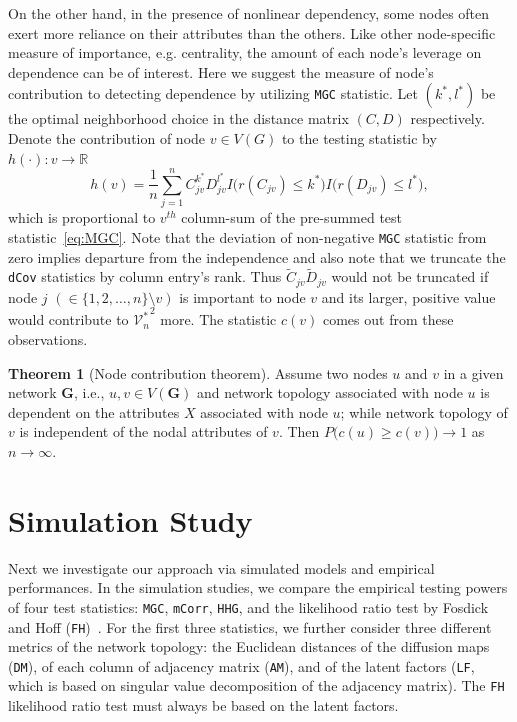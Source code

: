 \documentclass[11pt]{article}
\theoremstyle{definition}
\newtheorem{theorem}{Theorem}[section]
\begin{document}
On the other hand, in the presence of nonlinear dependency, some nodes often exert more reliance on their attributes than the others. Like other node-specific measure of importance, e.g. centrality,  the amount of each node's leverage on dependence can be of interest. Here we suggest the measure of node's contribution to detecting dependence by utilizing \texttt{MGC} statistic. Let $(k^{*}, l^{*})$ be the optimal neighborhood choice in the distance matrix $(C, D)$ respectively. Denote the contribution of node $v \in V(G)$ to the testing statistic by  $h(\cdot) : v \rightarrow \mathbb{R}$
\begin{equation}
\label{eq:contribution}
h(v) =  \frac{1}{n} \sum\limits_{j=1}^{n} C^{k^{*}}_{j v} D^{l^{*}}_{j v} I \big(  r (C_{j v}) \leq k^{*}  \big) I \big( r (D_{ j v }) \leq l^{*} \big), 
\end{equation}
which is proportional to $v^{th}$ column-sum of the pre-summed test statistic~\ref{eq:MGC}. Note that the deviation of non-negative \texttt{MGC} statistic from zero implies departure from the independence and also note that we truncate the \texttt{dCov} statistics by column entry's rank. Thus $\tilde{C}_{jv} \tilde{D}_{jv}$ would not be truncated if node $j$ $(\in \{ 1,2, \ldots, n \} \setminus v )$ is important to node $v$ and its larger, positive value would contribute to ${\mathcal{V}^{*}_{n}}^2$ more. The statistic $c(v)$ comes out from these observations. 

\begin{theorem}[Node contribution theorem]
	\label{contributiontheorem}
	Assume two nodes $u$ and $v$ in a given network $\mathbf{G}$, i.e., $u, v \in V(\mathbf{G})$ and network topology associated with node $u$  is dependent on the attributes $X$ associated with node $u$; while network topology of $v$ is independent of the nodal attributes of $v$. Then $P\big(  c(u)  \geq c(v) \big) \longrightarrow 1$ as $n \rightarrow \infty$.
\end{theorem}	

\section{Simulation Study}
\label{sec:simulation}
	\vspace*{-0.2cm}
Next we investigate our approach via simulated models and empirical performances. In the simulation studies, we compare the empirical testing powers of four test statistics: \texttt{MGC}, \texttt{mCorr}, \texttt{HHG}, and the likelihood ratio test by Fosdick and Hoff (\texttt{FH})~\cite{fosdick2015testing}. For the first three statistics, we further consider three different metrics of the network topology: the Euclidean distances of the diffusion maps (\texttt{DM}), of each column of adjacency matrix (\texttt{AM}), and of the latent factors (\texttt{LF}, which is based on singular value decomposition of the adjacency matrix). The \texttt{FH} likelihood ratio test must always be based on the latent factors.
\end{document}
